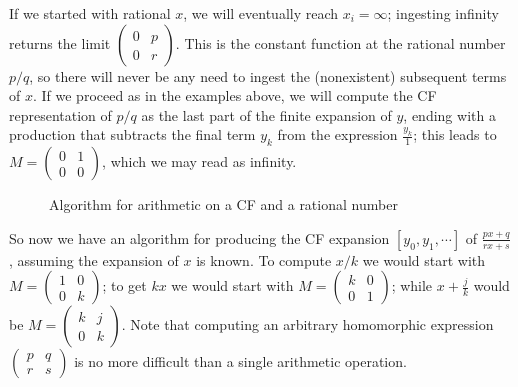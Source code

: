 \documentclass[11pt, oneside]{amsart}   	%
\newcommand{\pqrs}{\left(
\begin{smallmatrix} 
p & q\\ 
r & s 
\end{smallmatrix}
\right)}
\begin{document}
If we started with rational $x$, we will eventually reach $x_i = \infty$; ingesting infinity returns the limit ${\left(
\begin{smallmatrix} 
0 & p\\ 
0 & r
\end{smallmatrix}
\right)}$.
This is the constant function at the rational number $p/q$, so there will never be any need to ingest the (nonexistent) subsequent 
terms of $x$. If we proceed as in the examples above, we will compute the CF representation of $p/q$ as the last part of the finite
expansion of $y$, ending with a production that subtracts the final term $y_k$ from the expression $\frac{y_k}{1}$; this leads to
$M=\left(\begin{smallmatrix}0 & 1 \\ 0 & 0\end{smallmatrix}\right)$, which we may read as infinity.

\begin{figure}\label{fig:oneCFarith}
\begin{algorithmic}
 
 
\STATE{$M \gets \pqrs$} 
           \ENDWHILE
\ENDWHILE
\end{algorithmic}
\caption{Algorithm for arithmetic on a CF and a rational number}
\end{figure}

So now we have an algorithm for producing the CF expansion $[y_0,y_1,\cdots]$ of $\frac{px+q}{rx+s}$,
assuming the expansion of $x$ is known.
To compute $x/k$ we would start with $M=\left(
\begin{smallmatrix} 
1 & 0\\ 
0 & k 
\end{smallmatrix}
\right)$; 
to get $kx$ we would start with $M=\left(
\begin{smallmatrix} 
k & 0\\ 
0 & 1 
\end{smallmatrix}
\right)$; while $x+\frac{j}{k}$ would be $M=\left(
\begin{smallmatrix} 
k & j\\ 
0 & k 
\end{smallmatrix}
\right)$. Note that computing an arbitrary homomorphic expression $\pqrs$ is no more difficult than a single arithmetic operation.
\end{document}
